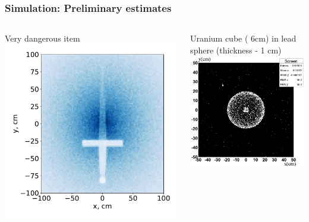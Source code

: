 \documentclass[11pt]{beamer}
\begin{document}
\begin{frame}
    \frametitle{Simulation: Preliminary estimates}
    \begin{columns}
        \begin{column}{0.5\textwidth}
            Very dangerous item\\
            \includegraphics[width=1\textwidth]{figures/Sword.pdf}
        \end{column}
        \begin{column}{0.5\textwidth}
            Uranium cube ( 6cm) in lead sphere (thickness - 1 cm)\\
            \includegraphics[width=1\textwidth]{figures/sim_cube_in_orb.jpeg}
        \end{column}
    \end{columns}  
\end{frame}
\end{document}
